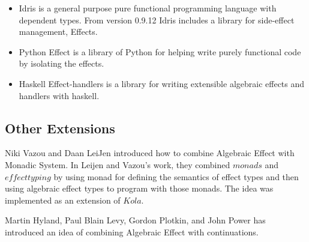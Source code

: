 \documentclass{article}
\begin{document}
\begin{itemize}
\item Idris is a general purpose pure functional programming language with dependent types. From version 0.9.12 Idris includes a library for side-effect management, Effects.


\item Python Effect is a library of Python for helping write purely functional code by isolating the effects\cite{python-effect}.

\item Haskell Effect-handlers is a library for writing extensible algebraic effects and handlers with haskell\cite{effect-handlers}.
\end{itemize}

\subsection{Other Extensions}

Niki Vazou and Daan LeiJen introduced how to combine Algebraic Effect with Monadic  System\cite{10.1007/978-3-319-28228-2_11}. In Leijen and Vazou's work, they combined $monads$ and $effect typing$ by using monad for defining the semantics of effect types and then using algebraic effect types to program with those monads. The idea was implemented as an extension of $Kola$.

Martin Hyland, Paul Blain Levy, Gordon Plotkin, and John Power has introduced an idea of combining Algebraic Effect with continuations\cite{HYLAND200720}.

{}
\end{document}
